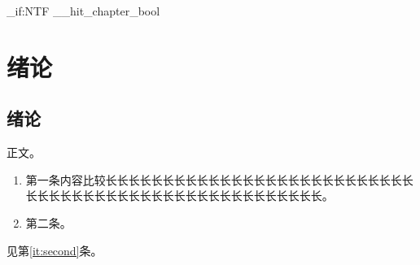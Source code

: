
\mainmatter
\ExplSyntaxOn
\bool_if:NTF \g__hit_chapter_bool { \chapter{绪论} } { \section{绪论} }
\ExplSyntaxOff
正文。
\begin{enumerate}
\item 第一条内容比较长长长长长长长长长长长长长长长长长长长长长长长长长长长长长长长长长长长长长长长长长长长长长长长长长长长长长。
\item 第二条。\label{it:second}
\end{enumerate}
见第\ref{it:second}条。


